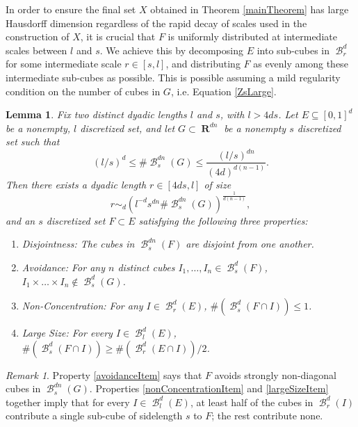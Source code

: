 \documentclass[dvipsnames,letterpaper,12pt]{article}
\numberwithin{equation}{section}
\theoremstyle{plain}
\newtheorem{lemma}{Lemma}
\theoremstyle{remark}
\newtheorem*{remark}{Remark}
\DeclareMathOperator{\RR}{\mathbf{R}}
\DeclareMathOperator{\B}{\mathcal{B}}
\begin{document}
In order to ensure the final set $X$ obtained in Theorem \ref{mainTheorem} has large Hausdorff dimension regardless of the rapid decay of scales used in the construction of $X$, it is crucial that $F$ is uniformly distributed at intermediate scales between $l$ and $s$.
We achieve this by decomposing $E$ into sub-cubes in $\B^d_r$ for some intermediate scale $r \in [s,l]$, and distributing $F$ as evenly among these intermediate sub-cubes as possible. This is possible assuming a mild regularity condition on the number of cubes in $G$, i.e. Equation \eqref{ZsLarge}.
%

\begin{lemma} \label{discretelemma}
	Fix two distinct dyadic lengths $l$ and $s$, with $l > 4ds$. Let $E \subseteq [0,1]^d$ be a nonempty, $l$ discretized set, and let $G\subset\RR^{dn}$ be a nonempty $s$ discretized set such that
	\begin{equation}\label{ZsLarge}
		(l/s)^d \leq \# \B^{dn}_s(G)  \leq \frac{(l/s)^{dn}}{(4d)^{d(n-1)}}.
	\end{equation} 
	Then there exists a dyadic length $r \in [4ds,l]$ of size
	\begin{equation} \label{rBound}
	 	r \sim_d \left( l^{-d} s^{dn} \# \B^{dn}_s(G) \right)^{\frac{1}{d(n-1)}},
	\end{equation}
	and an $s$ discretized set $F \subset E$ satisfying the following three properties:
	\begin{enumerate}
		\item \label{disjointness} \emph{Disjointness}: The cubes in $\B^{dn}_s(F)$ are disjoint from one another.

		\item\label{avoidanceItem} \emph{Avoidance}: For any $n$ distinct cubes $I_1, \dots, I_n \in \B^d_s(F)$, $I_1 \times \dots \times I_n \not \in \B^d_s(G)$.

		\item\label{nonConcentrationItem} \emph{Non-Concentration}: For any $I \in \B_r^d(E)$, $\#(\B_s^d(F \cap I)) \leq 1$.

		\item\label{largeSizeItem} \emph{Large Size}: For every $I \in \B^d_l(E)$, $\#(\B^d_s(F \cap I)) \geq \#(\B^d_r(E \cap I))/2$.
	\end{enumerate}
\end{lemma}

\begin{remark}
	Property \ref{avoidanceItem} says that $F$ avoids strongly non-diagonal cubes in $\B^{dn}_s(G)$. Properties \ref{nonConcentrationItem} and \ref{largeSizeItem} together imply that for every $I \in \B^d_l(E)$, at least half of the cubes in $\B_r^d(I)$ contribute a single sub-cube of sidelength $s$ to $F$; the rest contribute none. 
\end{remark}
\end{document}
